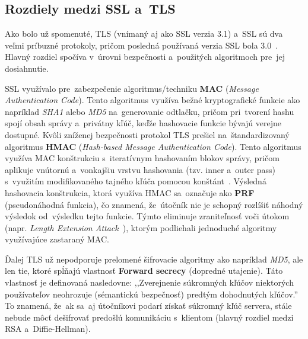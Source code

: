 \subsection{Rozdiely medzi SSL a~TLS}\label{th:SSL_TLS_diff}
Ako bolo už spomenuté, TLS  (vnímaný aj ako SSL verzia 3.1) a~SSL sú dva veľmi príbuzné protokoly, pričom posledná používaná verzia SSL bola 3.0~\cite{rfc7568}. Hlavný rozdiel spočíva v~úrovni bezpečnosti a~použitých algoritmoch pre~jej dosiahnutie.

SSL využívalo pre~zabezpečenie algoritmus/techniku \textbf{MAC} (\textit{Message Authentication Code}). Tento algoritmus využíva bežné kryptografické funkcie ako napríklad \textit{SHA1} alebo \textit{MD5} na~generovanie odtlačku, pričom pri~tvorení hashu spojí obsah správy a~privátny kľúč, keďže hashovacie funkcie bývajú verejne dostupné. Kvôli zníženej bezpečnosti protokol TLS prešiel na~štandardizovaný algoritmus \textbf{HMAC} (\textit{Hash-based Message Authentication Code}). Tento algoritmus využíva MAC konštrukciu s~iteratívnym hashovaním blokov správy, pričom aplikuje vnútornú a~vonkajšiu vrstvu hashovania (tzv. inner a~outer pass) s~využitím modifikovaného tajného kľúča pomocou konštánt~\cite{kim2006security}. Výsledná hashovacia konštrukcia, ktorá využíva HMAC sa~označuje ako \textbf{PRF}\label{th:prf} (pseudonáhodná funkcia), čo znamená, že~útočník nie je schopný rozlíšiť náhodný výsledok od~výsledku tejto funkcie. Týmto eliminuje zraniteľnosť voči útokom (napr. \textit{Length Extension Attack}~\cite{pentesterlab_lea}), ktorým podliehali jednoduché algoritmy využívajúce zastaraný MAC.

Ďalej TLS už nepodporuje prelomené šifrovacie algoritmy ako napríklad \textit{MD5}, ale len tie, ktoré spĺňajú vlastnosť \textbf{Forward secrecy} (dopredné utajenie). Táto vlastnosť je definovaná nasledovne: ,,Zverejnenie súkromných kľúčov niektorých používateľov neohrozuje (sémantickú bezpečnosť) predtým dohodnutých kľúčov.''~\cite{kim2006security} To znamená, že~ak sa~aj útočníkovi podarí získať súkromný kľúč servera, stále nebude môcť dešifrovať predošlú komunikáciu s~klientom (hlavný rozdiel medzi RSA a~Diffie-Hellman).

